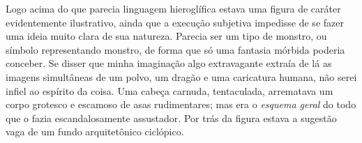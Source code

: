 Logo acima do que parecia linguagem hieroglífica estava uma figura de
caráter evidentemente ilustrativo, ainda que a execução subjetiva
impedisse de se fazer uma ideia muito clara de sua natureza. Parecia ser
um tipo de monstro, ou símbolo representando monstro, de forma que só
uma fantasia mórbida poderia conceber. Se disser que minha imaginação
algo extravagante extraía de lá as imagens simultâneas de um polvo, um
dragão e uma caricatura humana, não serei infiel ao espírito da coisa.
Uma cabeça carnuda, tentaculada, arrematava um corpo grotesco e escamoso
de asas rudimentares; mas era o \emph{esquema geral} do todo que o fazia
escandalosamente assustador. Por trás da figura estava a sugestão vaga
de um fundo arquitetônico ciclópico.

